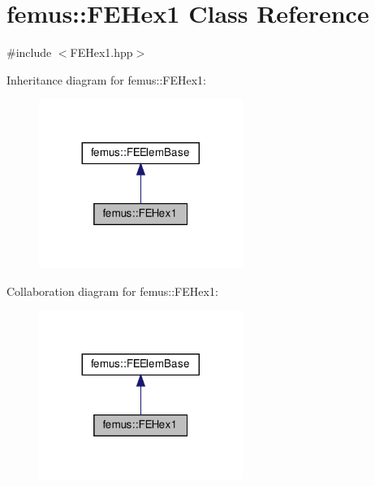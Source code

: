 \hypertarget{classfemus_1_1_f_e_hex1}{}\section{femus\+:\+:F\+E\+Hex1 Class Reference}
\label{classfemus_1_1_f_e_hex1}


{\ttfamily \#include $<$F\+E\+Hex1.\+hpp$>$}



Inheritance diagram for femus\+:\+:F\+E\+Hex1\+:
\nopagebreak
\begin{figure}[H]
\begin{center}
\leavevmode
\includegraphics[width=188pt]{classfemus_1_1_f_e_hex1__inherit__graph}
\end{center}
\end{figure}


Collaboration diagram for femus\+:\+:F\+E\+Hex1\+:
\nopagebreak
\begin{figure}[H]
\begin{center}
\leavevmode
\includegraphics[width=188pt]{classfemus_1_1_f_e_hex1__coll__graph}
\end{center}
\end{figure}
